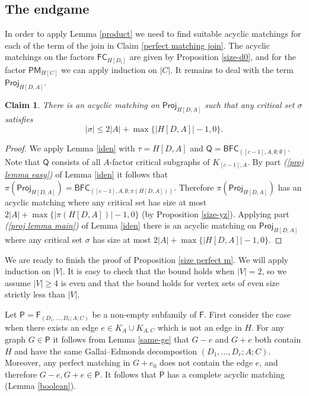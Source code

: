 \documentclass[10pt]{amsart}
\newtheorem{claim}[thm]{Claim}
\theoremstyle{definition}
\begin{document}
	
	\subsection*{The endgame}
	In order to apply Lemma \ref{product} we need to find suitable acyclic matchings for each of the term of the join in Claim \ref{perfect matching join}. The acyclic matchings on the factors $\mathsf{FC}_{H[D_i]}$ are given by Proposition \ref{size-d0}, and for the factor $\mathsf{PM}_{H[C]}$ we can apply induction on $|C|$. It remains to deal with the term $\mathsf{Proj}_{H[D,A]}$.
	
	\begin{claim}\label{second project}
		There is an acyclic matching on $\mathsf{Proj}_{H[D,A]}$ such that any critical set $\sigma$ satisfies
		\[|\sigma| \leq 2|A| + \max\{|H[D,A]|-1,0\}.\]
	\end{claim}
	
	\begin{proof}
		We apply Lemma \ref{iden} with $\tau = H[D,A]$ and $\mathsf{Q} = \mathsf{BFC}_{([c-1], A, \emptyset; \emptyset)}$. Note that $\mathsf{Q}$ consists of all $A$-factor critical subgraphs of $K_{[c-1], A}$. By part {\em (\ref{proj lemma easy})} of Lemma \ref{iden} it follows that $\pi(\mathsf{Proj}_{H[D,A]}) = \mathsf{BFC}_{([c-1], A, \emptyset; \pi(H[D,A]))}$. Therefore $\pi(\mathsf{Proj}_{H[D,A]})$ has an acyclic matching where any critical set has size at most $2|A| + \max\{|\pi(H[D,A])|-1,0\}$ (by Proposition \ref{size-yz}). Applying part {\em (\ref{proj lemma main})} of Lemma \ref{iden} there is an acyclic matching on $\mathsf{Proj}_{H[D,A]}$ where any critical set $\sigma$ has size at most $ 2|A| + \max\{|H[D,A]|-1, 0\}$.
	\end{proof}
	
	We are ready to finish the proof of Proposition \ref{size perfect m}. We will apply induction on $|V|$. It is easy to check that the bound holds when $|V|=2$, so we assume $|V|\geq 4$ is even and that the bound holds for vertex sets of even size strictly less than $|V|$.
	
	Let $\mathsf{P} = \mathsf{F}_{(D_1, \dots, D_r; A; C)}$ be a non-empty subfamily of $\mathsf{F}$. First consider the case when there exists an edge $e\in K_A \cup K_{A,C}$ which is not an edge in $H$. For any graph $G\in \mathsf{P}$ it follows from Lemma \ref{same-ge} that $G-e$ and $G+e$ both contain $H$ and have the same Gallai--Edmonds decompostion $(D_1, \dots, D_r; A; C)$. Moreover, any perfect matching in $G+e_0$ does not contain the edge $e$, and therefore $G-e, G+e\in \mathsf{P}$. It follows that $\mathsf{P}$ has a complete acyclic matching (Lemma \ref{boolean}). 
	
\end{document}
